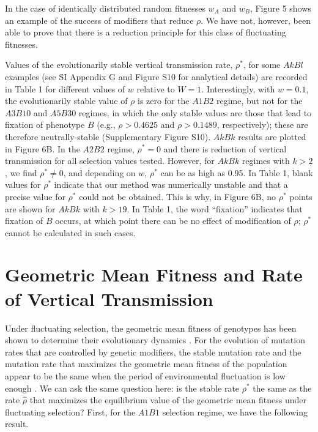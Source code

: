 \documentclass[9pt,twocolumn,twoside,lineno]{pnas-new}
\begin{document}
 In the case of identically distributed random fitnesses $w_A$ and $w_B$, Figure 5 shows  an example of the success of modifiers that reduce $\rho$. We have not, however, been able to prove that there is a reduction principle for this class of fluctuating fitnesses.
  

Values of the evolutionarily stable vertical transmission rate, $\rho^*$, for some $AkBl$ examples (see SI Appendix G and  Figure S10 for analytical details) are recorded in Table 1 for different values of $w$ relative to $W=1$.
Interestingly, with $w=0.1$, the evolutionarily stable value of $\rho$ is zero for the $A1B2$ regime, but not for the $A3B10$ and $A5B30$ regimes, in which the only stable values are those that lead to fixation of phenotype $B$ (e.g., $\rho>0.4625$ and $\rho>0.1489$, respectively); these are therefore neutrally-stable (Supplementary Figure S10).
$AkBk$ results are plotted in Figure 6B.
In the $A2B2$ regime, $\rho^* =0$ and there is reduction of vertical transmission for all selection values tested.
However, for $AkBk$ regimes with $k>2$, we find $\rho^*\ne 0$, and depending on $w$, $\rho^*$ can be as high as 0.95.
In Table 1, blank values for $\rho^*$ indicate that our method was numerically unstable  and that a precise value for $\rho^*$ could not be obtained.
This is why, in Figure 6B, no $\rho^*$ points are shown for $AkBk$ with $k>19$.
In Table 1, the word ``fixation'' indicates that fixation of $B$ occurs, at which point there can be no effect of modification of $\rho$; $\rho^*$ cannot be calculated in such cases.

\section{Geometric Mean Fitness and Rate of Vertical Transmission}

Under fluctuating selection, the geometric mean fitness of genotypes has been shown to determine their evolutionary dynamics \cite{haldane1963polymorphism,karlin1974random,wakano2004evolution}. For the evolution of mutation rates that are controlled by genetic modifiers, the stable mutation rate and the mutation rate that maximizes the geometric mean fitness of the population appear to be the same when the period of environmental fluctuation is low enough \cite{liberman2011evolution}. We can ask the same question here: is the stable rate $\rho^*$ the same as the rate $\hat\rho$ that maximizes the equilibrium value of the geometric mean fitness under fluctuating selection?
First, for  the $A1B1$ selection regime, we have the following result.
\medskip
\end{document}
